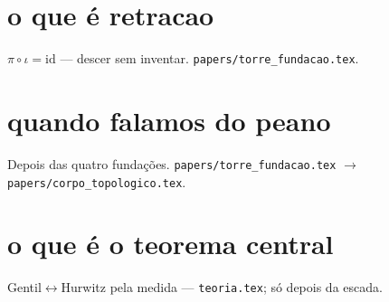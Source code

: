 \documentclass[11pt,a4paper]{article}
\newcommand{\code}[1]{\texttt{\small #1}}
\begin{document}
\section{o que é retracao}
$\pi\circ\iota=\mathrm{id}$ --- descer sem inventar.
\code{papers/torre\_fundacao.tex}.

\section{quando falamos do peano}
Depois das quatro fundações.
\code{papers/torre\_fundacao.tex} $\to$ \code{papers/corpo\_topologico.tex}.

\section{o que é o teorema central}
Gentil$\leftrightarrow$Hurwitz pela medida --- \code{teoria.tex}; só depois da escada.
\end{document}
